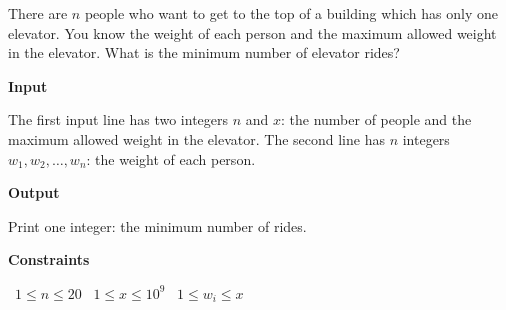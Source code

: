 There are $n$ people who want to get to the top of a building which has only one elevator. You know the weight of each person and the maximum allowed weight in the elevator. What is the minimum number of elevator rides?

\vspace{0.3cm}\noindent\textbf{Input}

The first input line has two integers $n$ and $x$: the number of people and the maximum allowed weight in the elevator.
The second line has $n$ integers $w_1,w_2,\dots,w_n$: the weight of each person.

\vspace{0.3cm}\noindent\textbf{Output}

Print one integer: the minimum number of rides.

\vspace{0.3cm}\noindent\textbf{Constraints}

\textbullet\ $1 \le n \le 20$
\textbullet\ $1 \le x \le 10^9$
\textbullet\ $1 \le w_i \le x$